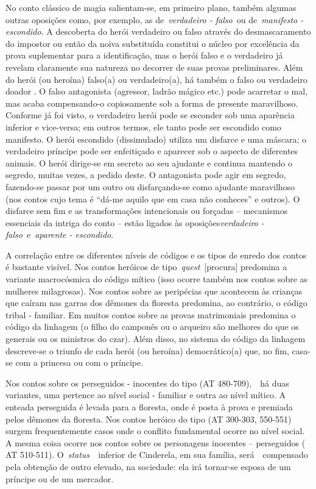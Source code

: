 No conto clássico de magia salientam-se, em primeiro plano, também
algumas outras oposições como, por exemplo, as de~\emph{verdadeiro -
falso}~ou de~\emph{manifesto - escondido}. A descoberta do herói
verdadeiro ou falso através do desmascaramento do impostor ou então da
noiva substituída constitui o núcleo por excelência da prova suplementar
para a identificação, mas o herói falso e o verdadeiro já revelam
claramente sua natureza no decorrer de suas provas preliminares. Além do
herói (ou heroína) falso(a) ou verdadeiro(a), há também o falso ou
verdadeiro doador . O falso antagonista (agressor, ladrão mágico etc.)
pode acarretar o mal, mas acaba compensando-o copiosamente sob a forma
de presente maravilhoso. Conforme já foi visto, o verdadeiro herói pode
se esconder sob uma aparência inferior e vice-versa; em outros termos,
ele tanto pode ser escondido como manifesto. O herói escondido
(dissimulado) utiliza um disfarce e uma máscara; o verdadeiro príncipe
pode ser enfeitiçado e aparecer sob o aspecto de diferentes animais. O
herói dirige-se em secreto ao seu ajudante e continua mantendo o
segredo, muitas vezes, a pedido deste. O antagonista pode agir em
segredo, fazendo-se passar por um outro ou disfarçando-se como ajudante
maravilhoso (nos contos cujo tema é ``dá-me aquilo que em casa não
conheces'' e outros). O disfarce sem fim e as transformações
intencionais ou forçadas -- mecanismos essenciais da intriga do conto --
estão ligados às oposições\emph{verdadeiro - falso}~e~\emph{aparente -
escondido}.

A correlação entre os diferentes níveis de códigos e os tipos de enredo
dos contos é bastante visível. Nos contos heróicos de
tipo~\emph{quest}~{[}procura{]} predomina a variante macrocósmica do
código mítico (isso ocorre também nos contos sobre as mulheres
milagrosas). Nos contos sobre as peripécias que acontecem às crianças
que caíram nas garras dos dêmones da floresta predomina, ao contrário, o
código tribal - familiar. Em muitos contos sobre as provas matrimoniais
predomina o código da linhagem (o filho do camponês ou o arqueiro são
melhores do que os generais ou os ministros do czar). Além disso, no
sistema do código da linhagem descreve-se o triunfo de cada herói (ou
heroína) democrático(a) que, no fim, casa-se com a princesa ou com o
príncipe.

Nos contos sobre os perseguidos - inocentes do tipo (AT 480-709),~~há
duas variantes, uma pertence ao nível social - familiar e outra ao nível
mítico. A enteada perseguida é levada para a floresta, onde é posta à
prova e premiada pelos dêmones da floresta. Nos contos heróico do tipo
(AT 300-303, 550-551) surgem frequentemente casos onde o conflito
fundamental ocorre no nível social. A mesma coisa ocorre nos contos
sobre os personagens inocentes -- perseguidos ( AT 510-511).
O~\emph{status~}~inferior de Cinderela, em sua família, será~~compensado
pela obtenção de outro elevado, na sociedade: ela irá tornar-se esposa
de um príncipe ou de um mercador.

